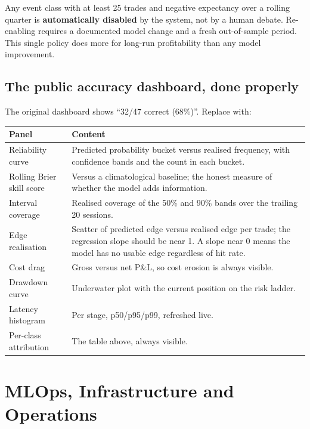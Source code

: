 \begin{keybox}[title={Class-level kill policy}]
Any event class with at least 25 trades and negative expectancy over a rolling
quarter is \textbf{automatically disabled} by the system, not by a human debate.
Re-enabling requires a documented model change and a fresh out-of-sample
period. This single policy does more for long-run profitability than any model
improvement.
\end{keybox}

\section{The public accuracy dashboard, done properly}

The original dashboard shows ``32/47 correct (68\%)''. Replace with:

\begin{longtable}{@{}p{4.6cm}p{9.8cm}@{}}
\toprule
\textbf{Panel} & \textbf{Content}\\
\midrule
Reliability curve & Predicted probability bucket versus realised frequency, with
confidence bands and the count in each bucket.\\
Rolling Brier skill score & Versus a climatological baseline; the honest measure
of whether the model adds information.\\
Interval coverage & Realised coverage of the 50\% and 90\% bands over the
trailing 20 sessions.\\
Edge realisation & Scatter of predicted edge versus realised edge per trade;
the regression slope should be near 1. A slope near 0 means the model has no
usable edge regardless of hit rate.\\
Cost drag & Gross versus net P\&L, so cost erosion is always visible.\\
Drawdown curve & Underwater plot with the current position on the risk ladder.\\
Latency histogram & Per stage, p50/p95/p99, refreshed live.\\
Per-class attribution & The table above, always visible.\\
\bottomrule
\end{longtable}

\chapter{MLOps, Infrastructure and Operations}
\label{ch:mlops}

